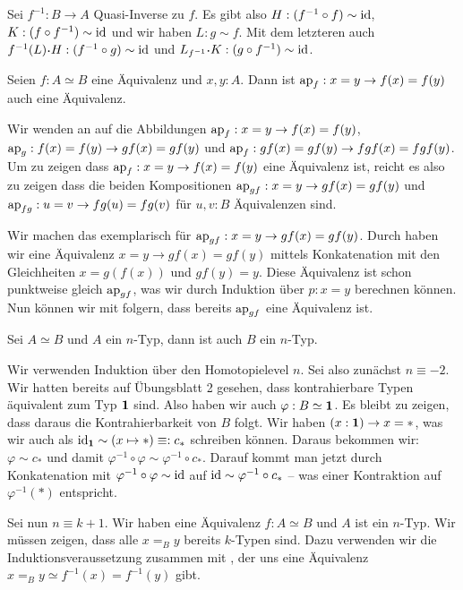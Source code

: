 \begin{beweis}
  Sei $f^{-1}:B\to A$ Quasi-Inverse zu $f$.
  Es gibt also $H:(f^{-1}\circ f)\sim\mathrm{id}$, $K:(f\circ f^{-1})\sim\mathrm{id}$ und wir haben $L:g\sim f$.
  Mit dem letzteren auch $f^{-1}(L)\kon H:(f^{-1}\circ g)\sim \id$ und $L_{f^{-1}}\kon K:(g\circ f^{-1})\sim\id$.
\end{beweis}

\begin{satz}
  \label{ap-equiv}
  Seien $f:A\simeq B$ eine Äquivalenz und $x,y:A$. Dann ist $\mathrm{ap}_f:x=y\to f(x)=f(y)$ auch eine Äquivalenz.  
\end{satz}

\begin{beweis}
  Wir wenden  an auf die Abbildungen $\mathrm{ap}_f:x=y\to f(x)=f(y)$, $\mathrm{ap}_g:f(x)=f(y)\to gf(x)=gf(y)$ und $\mathrm{ap}_f:gf(x)=gf(y)\to fgf(x)=fgf(y)$.
  Um zu zeigen dass $\mathrm{ap}_{f}:x=y\to f(x)=f(y)$ eine Äquivalenz ist, reicht es also zu zeigen dass die beiden Kompositionen $\mathrm{ap}_{gf}:x=y\to gf(x)=gf(y)$ und $\mathrm{ap}_{fg}:u=v\to fg(u)=fg(v)$ für $u,v:B$ Äquivalenzen sind.

  Wir machen das exemplarisch für $\mathrm{ap}_{gf}:x=y\to gf(x)=gf(y)$.
  Durch  haben wir eine Äquivalenz $x=y\to gf(x)=gf(y)$ mittels Konkatenation mit den Gleichheiten $x=g(f(x))$ und $gf(y)=y$.
  Diese Äquivalenz ist schon punktweise gleich $\mathrm{ap}_{gf}$, was wir durch Induktion über $p:x=y$ berechnen können.
  Nun können wir mit  folgern, dass bereits $\mathrm{ap}_{gf}$ eine Äquivalenz ist.
\end{beweis}

\begin{korollar}
  Sei $A\simeq B$ und $A$ ein $n$-Typ, dann ist auch $B$ ein $n$-Typ.
\end{korollar}

\begin{beweis}
  Wir verwenden Induktion über den Homotopielevel $n$.
  Sei also zunächst $n\equiv -2$.
  Wir hatten bereits auf Übungsblatt 2 gesehen, dass kontrahierbare Typen äquivalent zum Typ $\mathbf{1}$ sind.
  Also haben wir auch $\varphi:B\simeq \mathbf{1}$. Es bleibt zu zeigen, dass daraus die Kontrahierbarkeit von $B$ folgt. Wir haben $(x:\mathbf{1})\to x=\ast$, was wir auch als $\mathrm{id}_{\mathbf{1}}\sim(x\mapsto \ast)\equiv: c_{\ast}$ schreiben können.
  Daraus bekommen wir: $\varphi\sim c_{\ast}$ und damit $\varphi^{-1}\circ\varphi \sim \varphi^{-1}\circ c_\ast$. Darauf kommt man jetzt durch Konkatenation mit $\varphi^{-1}\circ\varphi\sim\mathrm{id}$ auf $\mathrm{id}\sim \varphi^{-1} \circ c_\ast$ -- was einer Kontraktion auf $\varphi^{-1}(\ast)$ entspricht.

  Sei nun $n\equiv k+1$.
  Wir haben eine Äquivalenz $f:A\simeq B$ und $A$ ist ein $n$-Typ.
  Wir müssen zeigen, dass alle $x=_B y$ bereits $k$-Typen sind.
  Dazu verwenden wir die Induktionsveraussetzung zusammen mit , der uns eine Äquivalenz $x=_B y\simeq f^{-1}(x)=f^{-1}(y)$ gibt.
\end{beweis}

